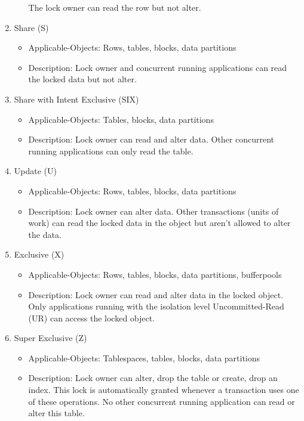\documentclass{vldb}
\begin{document}
\begin{enumerate}
\begin{itemize}
The lock owner can read the row but not alter.
\end{itemize}
\item Share (S)
\begin{itemize}
\item Applicable-Objects: Rows, tables, blocks, data partitions
\item Description: Lock owner and concurrent running applications can read the locked data but not alter.
\end{itemize}
\item Share with Intent Exclusive (SIX)
\begin{itemize}
\item Applicable-Objects: Tables, blocks, data partitions
\item Description: Lock owner can read and alter data. Other concurrent running applications can only read the table.
\end{itemize}
\item Update (U)
\begin{itemize}
\item Applicable-Objects: Rows, tables, blocks, data partitions
\item Description: Lock owner can alter data. Other transactions (units of work) can read the locked data in the object but aren't allowed to alter the data.
\end{itemize}
\item Exclusive (X)
\begin{itemize}
\item Applicable-Objects: Rows, tables, blocks, data partitions, bufferpools
\item Description: Lock owner can read and alter data in the locked object. Only applications running with the isolation level Uncommitted-Read (UR)
can access the locked object.
\end{itemize}
\item Super Exclusive (Z)
\begin{itemize}
\item Applicable-Objects: Tablespaces, tables, blocks, data partitions
\item Description: Lock owner can alter, drop the table or create, drop an index. This lock is automatically granted whenever a transaction uses one of these
operations. No other concurrent running application can read or alter this table.
\end{itemize}
\end{enumerate}
\end{document}

